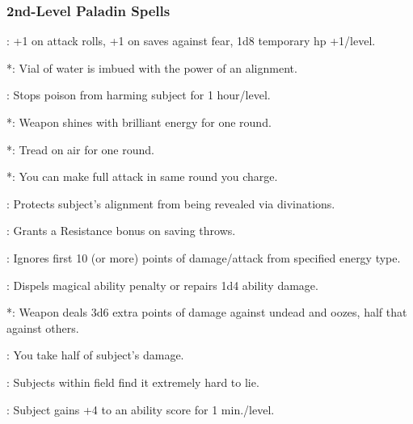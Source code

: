 \subsubsection{2nd-Level Paladin Spells}
\begin{list}{}{\leftmargin=1em}
\item {}: +1 on attack rolls, +1 on saves against fear, 1d8 temporary hp +1/level.
\item {}*: Vial of water is imbued with the power of an alignment.
\item {}: Stops poison from harming subject for 1 hour/level.
\item {}*: Weapon shines with brilliant energy for one round.
\item {}*: Tread on air for one round.
\item {}*: You can make full attack in same round you charge.
\item {}: Protects subject's alignment from being revealed via divinations.
\item {}: Grants a Resistance bonus on saving throws.
\item {}: Ignores first 10 (or more) points of damage/attack from specified energy type.
\item {}: Dispels magical ability penalty or repairs 1d4 ability damage.
\item {}*: Weapon deals 3d6 extra points of damage against undead and oozes, half that against others.
\item {}: You take half of subject's damage.
\item {}: Subjects within field find it extremely hard to lie.
\item {}: Subject gains +4 to an ability score for 1 min./level.
\end{list}

